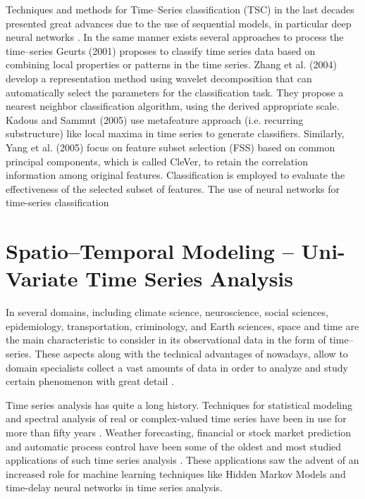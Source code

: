 
Techniques and methods for Time--Series classification (TSC) in the last decades presented great advances due to the use of sequential models, in particular deep neural networks \cite{Fawaz2019}. In the same manner exists several approaches to process the time--series 
Geurts (2001) proposes to classify time series data based on combining local properties or patterns in the time series. Zhang et al. (2004) develop a representation method using wavelet decomposition that can automatically select the parameters for the classification task. They propose a nearest neighbor classification algorithm, using the derived appropriate scale. Kadous and Sammut (2005) use metafeature approach (i.e. recurring substructure) like local maxima in time series to generate classifiers. Similarly, Yang et al. (2005) focus on feature subset selection (FSS) based on common principal components, which is called CleVer, to retain the correlation information among original features. Classification is employed to evaluate the effectiveness of the selected subset of features. 
The use of neural networks for time-series classification

\section{Spatio--Temporal Modeling -- Uni-Variate Time Series Analysis}
\label{Sec:STModeling}

In several domains, including climate science, neuroscience, social sciences, epidemiology, transportation, criminology, and Earth sciences, space and time are the main characteristic to consider in its observational data in the form of time--series. These aspects along with the technical advantages of nowadays, allow to domain specialists collect a vast amounts of data in order to analyze and study certain phenomenon with great detail \cite{}. 

Time series analysis has quite a long history. Techniques for statistical modeling and spectral analysis of real or complex-valued time series have been in use for more than fifty years \cite{Hyndman2006, Chatfield2019}. Weather forecasting, financial or stock market prediction and automatic process control have been some of the oldest and most studied applications of such time series analysis \cite{Box1976}. These applications saw the advent of an increased role for machine learning techniques like Hidden Markov Models and time-delay neural networks in time series analysis.



